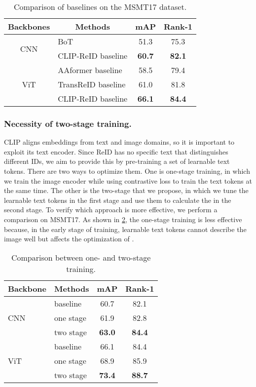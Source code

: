 \documentclass[letterpaper]{article} \usepackage{aaai23}  \usepackage{times}  \usepackage{helvet}  \usepackage{courier}  \usepackage[hyphens]{url}  \usepackage{graphicx} \urlstyle{rm} \def\UrlFont{\rm}  \usepackage{natbib}  \usepackage{caption} \frenchspacing  \setlength{\pdfpagewidth}{8.5in}  \setlength{\pdfpageheight}{11in}  \usepackage{algorithm}
\begin{document}
\begin{table}[]
\centering
\begin{tabular}{c|l|cc}
\hline
Backbones & \multicolumn{1}{c|}{Methods} & mAP & Rank-1 \\ \hline
\multirow{2}{*}{CNN} & BoT & 51.3 & 75.3 \\
 & CLIP-ReID baseline & \textbf{60.7} & \textbf{82.1} \\ \hline
\multirow{3}{*}{ViT} & AAformer baseline & 58.5 & 79.4 \\
 & TransReID baseline & 61.0 & 81.8 \\
 & CLIP-ReID baseline & \textbf{66.1} & \textbf{84.4} \\ \hline
\end{tabular}
\caption{Comparison of baselines on the MSMT17 dataset.}
\label{tab:baseline} 
\end{table}

\subsubsection{Necessity of two-stage training.}
CLIP aligns embeddings from text and image domains, so it is important to exploit its text encoder. Since ReID has no specific text that distinguishes different IDs, we aim to provide this by pre-training a set of learnable text tokens. There are two ways to optimize them. One is one-stage training, in which we train the image encoder  while using contrastive loss to train the text tokens at the same time. The other is the two-stage that we propose, in which we tune the learnable text tokens in the first stage and use them to calculate the  in the second stage. To verify which approach is more effective, we perform a comparison on MSMT17. As shown in \cref{tab:stage}, the one-stage training is less effective because, in the early stage of training, learnable text tokens cannot describe the image well but affects the optimization of .

\begin{table}[]
\centering
\begin{tabular}{l|l|cc}
\hline
Backbone & Methods & mAP & Rank-1 \\ \hline
\multirow{3}{*}{CNN} & baseline & 60.7 & 82.1 \\
 & one stage & 61.9 & 82.8 \\
 & two stage & \textbf{63.0} & \textbf{84.4} \\ \hline
\multirow{3}{*}{ViT} & baseline & 66.1 & 84.4 \\
 & one stage & 68.9 & 85.9 \\
 & two stage & \textbf{73.4} & \textbf{88.7} \\ \hline
\end{tabular}
\caption{Comparison between one- and two-stage training.}
\label{tab:stage}
\end{table}
\end{document}
